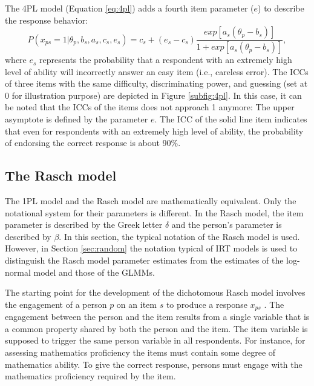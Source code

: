 \documentclass[12pt]{book}
\begin{document}
The 4PL model (Equation \ref{eq:4pl}) \cite{4plbarton} adds a fourth item parameter ($e$) to describe the response behavior:
\begin{equation}\label{eq:4pl}
	P(x_{ps} = 1 | \theta_p, b_s, a_s, c_s, e_s) = c_s + (e_s-c_s)\frac{exp[a_s(\theta_p - b_s)]}{1 + exp[a_s(\theta_p - b_s)]},
\end{equation} 
where $e_s$ represents the probability that a respondent with an extremely high level of ability will incorrectly answer an easy item (i.e., careless error). 
The ICCs of three items with the same difficulty, discriminating power, and guessing (set at 0 for illustration purpose) are depicted in Figure \ref{subfig:4pl}.
	In this case, it can be noted that the ICCs of the items does not approach 1 anymore: The upper asymptote is defined by the parameter $e$. 
	The ICC of the solid line item indicates that even for respondents with an extremely high level of ability, the probability of endorsing the correct response is about 90\%. 



\subsection{The Rasch model}

The 1PL model and the Rasch model are mathematically equivalent. Only the notational system for their parameters is different. In the Rasch model, the item parameter is described by the Greek letter $\delta$ and the person's parameter is described by $\beta$. 
In this section, the typical notation of the Rasch model is used. However, in Section \ref{sec:random} the notation typical of IRT models is used to distinguish the Rasch model parameter estimates from the estimates of the log-normal model and those of the GLMMs.

The starting point for the development of the dichotomous Rasch model \cite{rasch1960} involves the engagement of a person $p$ on an item $s$ to produce a response $x_{ps}$ \cite{andrich}. 
The engagement between the person and the item results from a single variable that is a common property shared by both the person and the item. The item variable is supposed to trigger the same person variable in all respondents.
For instance, for assessing mathematics proficiency the items must contain some degree of mathematics ability. To give the correct response, persons must engage with the mathematics proficiency required by the item.   
\end{document}

